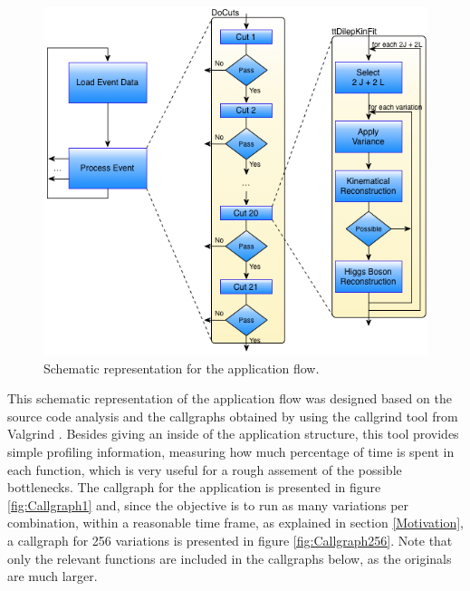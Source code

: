 \begin{figure}[!htp]
	\begin{center}
		\includegraphics[scale=0.5]{../../common/img/graf_abstract_flow_with_kinfit.png}
		\caption{Schematic representation for the \tth application flow.}
		\label{fig:SchematicFlow1}
	\end{center}
\end{figure}

This schematic representation of the application flow was designed based on the source code analysis and the callgraphs obtained by using the callgrind tool from Valgrind \cite{Valgrind}. Besides giving an inside of the application structure, this tool provides simple profiling information, measuring how much percentage of time is spent in each function, which is very useful for a rough assement of the possible bottlenecks. The callgraph for the application is presented in figure \ref{fig:Callgraph1} and, since the objective is to run as many variations per combination, within a reasonable time frame, as explained in section \ref{Motivation}, a callgraph for 256 variations is presented in figure \ref{fig:Callgraph256}. Note that only the relevant functions are included in the callgraphs below, as the originals are much larger.

